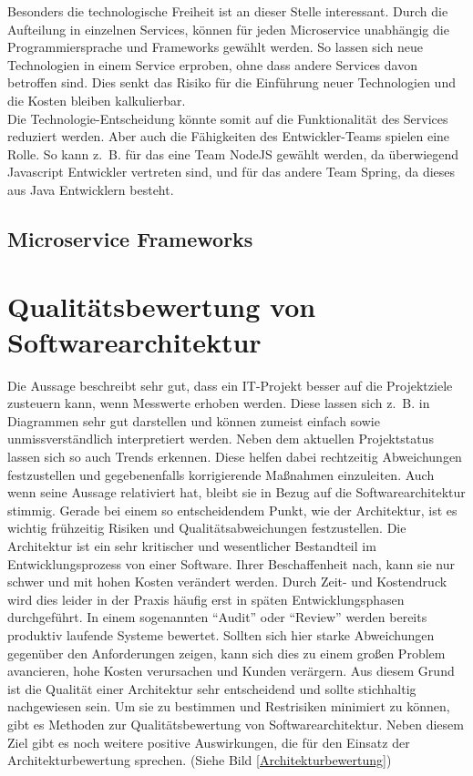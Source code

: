 Besonders die technologische Freiheit ist an dieser Stelle interessant. Durch die Aufteilung in einzelnen Services, können für jeden Microservice unabhängig die Programmiersprache und Frameworks gewählt werden. So lassen sich neue Technologien in einem Service erproben, ohne dass andere Services davon betroffen sind. Dies senkt das Risiko für die Einführung neuer Technologien und die Kosten bleiben kalkulierbar\cite[13]{Wolff2015}.\\
Die Technologie-Entscheidung könnte somit auf die Funktionalität des Services reduziert werden. Aber auch die Fähigkeiten des Entwickler-Teams spielen eine Rolle. So kann z.~B. für das eine Team NodeJS gewählt werden, da überwiegend Javascript Entwickler vertreten sind, und für das andere Team Spring, da dieses aus Java Entwicklern besteht.

\subsection{Microservice Frameworks}

\section{Qualitätsbewertung von Softwarearchitektur}


Die Aussage beschreibt sehr gut, dass ein IT-Projekt besser auf die Projektziele
zusteuern kann, wenn Messwerte erhoben werden. Diese lassen sich z.~B. in Diagrammen sehr gut darstellen und können zumeist einfach sowie unmissverständlich interpretiert werden. Neben dem aktuellen Projektstatus lassen sich so auch Trends erkennen. Diese helfen dabei rechtzeitig Abweichungen festzustellen und gegebenenfalls korrigierende Maßnahmen einzuleiten\cite{Starke2015}. Auch wenn \citeauthor{DeMarco2009} \citeyear{DeMarco2009} seine Aussage relativiert hat\cite{DeMarco2009}, bleibt sie in Bezug auf die Softwarearchitektur stimmig.
Gerade bei einem so entscheidendem Punkt, wie der Architektur, ist es wichtig frühzeitig
Risiken und Qualitätsabweichungen festzustellen. Die Architektur ist ein sehr kritischer
und wesentlicher Bestandteil im Entwicklungsprozess von einer Software. Ihrer Beschaffenheit nach,
kann sie nur schwer und mit hohen Kosten verändert werden.
Durch Zeit- und Kostendruck wird dies leider in der Praxis häufig erst in späten Entwicklungsphasen durchgeführt. 
In einem sogenannten \enquote{Audit} oder \enquote{Review} werden bereits produktiv laufende Systeme bewertet\cite{Starke2015}.
Sollten sich hier starke Abweichungen gegenüber den Anforderungen zeigen, kann sich dies zu einem großen Problem 
avancieren, hohe Kosten verursachen und Kunden verärgern.
Aus diesem Grund ist die Qualität einer Architektur sehr entscheidend und sollte stichhaltig nachgewiesen sein.
Um sie zu bestimmen und Restrisiken minimiert zu können, gibt es Methoden zur Qualitätsbewertung 
von Softwarearchitektur. Neben diesem Ziel gibt es noch weitere positive Auswirkungen, die für den Einsatz der Architekturbewertung sprechen. (Siehe Bild \ref{Architekturbewertung})


